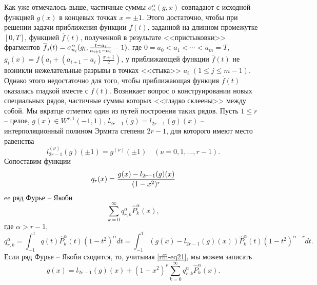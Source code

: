 Как уже отмечалось выше, частичные суммы $\sigma_n^\alpha(g,x)$
совпадают с исходной функцией $g(x)$ в концевых точках $x=\pm1$.  Этого достаточно, чтобы при решении задачи приближения функции $f(t)$, заданной на длинном промежутке $[0,T]$, функцией  $\overline f(t)$, полученной в результате <<пристыковки>> фрагментов $\overline f_i(t)=\sigma_{n_i}^\alpha(g_i,{t-a_i\over a_{i+1}-a_i}-1)$, где $0=a_0<a_1<\cdots<a_m=T$, $g_i(x)=f(a_i+(a_{i+1}-a_i)\frac{x+1}{2})$, у приближающей функции $\overline f(t)$  не возникли нежелательные разрывы в точках <<стыка>> $a_i$ $(1\le j\le m-1)$. Однако этого недостаточно для того, чтобы приближающая функция $\overline f(t)$ оказалась гладкой вместе с $f(t)$. Возникает вопрос о конструировании новых специальных рядов, частичные суммы которых <<гладко склеены>> между собой. Мы вкратце отметим один из путей построения таких рядов.
Пусть $1\le r$ -- целое, $g(x)\in W^{r,1}(-1,1)$, $l_{2r-1}(g)=l_{2r-1}(g)(x)$ -- интерполяционный полином Эрмита степени $2r-1$,
для которого имеют место равенства
\begin{equation}\label{rffi-eq20}
l_{2r-1}^{(\nu)}(g)(\pm1)=g^{(\nu)}(\pm1)\quad (\nu=0,1,\ldots,r-1).
\end{equation}
Сопоставим функции
\begin{equation}\label{rffi-eq21}
q_r(x)={g(x)-l_{2r-1}(g)(x)\over(1-x^2)^r}
\end{equation}
ee ряд Фурье -- Якоби
\begin{equation}\label{rffi-eq22}
\sum_{k=0}^\infty q_{r,k}^\alpha\hat P_k^\alpha(x),
\end{equation}
где $\alpha>r-1$,
\begin{equation}\label{rffi-eq23}
q_{r,k}^\alpha=\int_{-1}^1 q(t)\hat P_k^\alpha(t)(1-t^2)^\alpha dt=\int_{-1}^1 (g(x)-l_{2r-1}(g)(x))\hat P_k^\alpha(t)(1-t^2)^{\alpha-r} dt.
\end{equation}
Если ряд Фурье -- Якоби сходится, то, учитывая \eqref{rffi-eq21}, мы можем записать
\begin{equation}\label{rffi-eq24}
g(x)=l_{2r-1}(g)(x)+(1-x^2)^r\sum_{k=0}^\infty q_{r,k}^\alpha\hat P_k^\alpha(x).
\end{equation}
